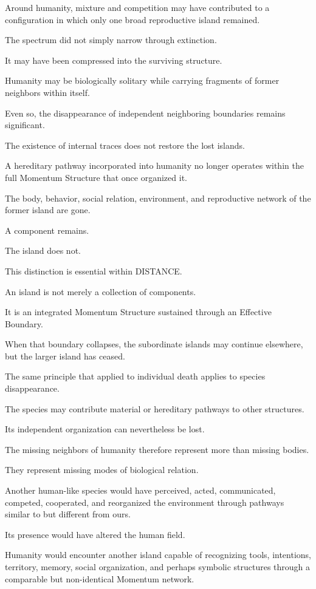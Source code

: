 Around humanity, mixture and competition may have contributed to a configuration in which only one broad reproductive island remained.

The spectrum did not simply narrow through extinction.

It may have been compressed into the surviving structure.

Humanity may be biologically solitary while carrying fragments of former neighbors within itself.

Even so, the disappearance of independent neighboring boundaries remains significant.

The existence of internal traces does not restore the lost islands.

A hereditary pathway incorporated into humanity no longer operates within the full Momentum Structure that once organized it.

The body, behavior, social relation, environment, and reproductive network of the former island are gone.

A component remains.

The island does not.

This distinction is essential within DISTANCE.

An island is not merely a collection of components.

It is an integrated Momentum Structure sustained through an Effective Boundary.

When that boundary collapses, the subordinate islands may continue elsewhere, but the larger island has ceased.

The same principle that applied to individual death applies to species disappearance.

The species may contribute material or hereditary pathways to other structures.

Its independent organization can nevertheless be lost.

The missing neighbors of humanity therefore represent more than missing bodies.

They represent missing modes of biological relation.

Another human-like species would have perceived, acted, communicated, competed, cooperated, and reorganized the environment through pathways similar to but different from ours.

Its presence would have altered the human field.

Humanity would encounter another island capable of recognizing tools, intentions, territory, memory, social organization, and perhaps symbolic structures through a comparable but non-identical Momentum network.

